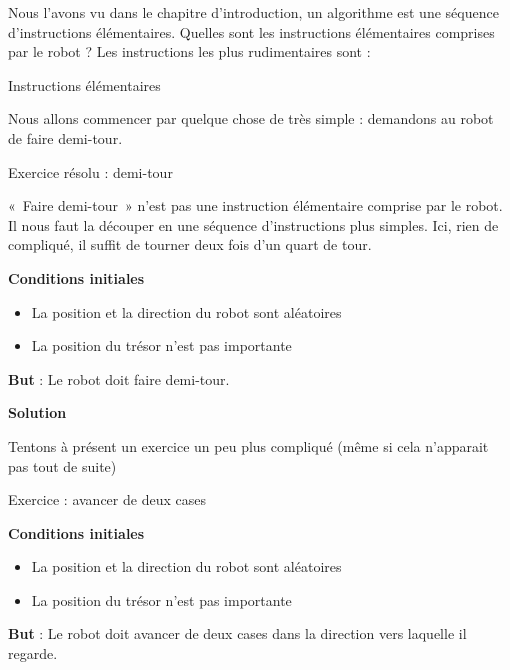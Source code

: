 	Nous l'avons vu dans le chapitre
	d'introduction, un algorithme est une séquence
	d'instructions élémentaires. Quelles sont les
	instructions élémentaires comprises par le robot ? Les instructions les
	plus rudimentaires sont :
	
	\begin{Emphase}{Instructions élémentaires}
	\end{Emphase}
		
	Nous allons commencer par quelque chose de très simple : demandons au
	robot de faire demi-tour.

	\begin{Emphase}{Exercice résolu : demi-tour}

		«~Faire demi-tour~» n'est pas une instruction
		élémentaire comprise par le robot. Il nous faut la découper en une
		séquence d'instructions plus simples. Ici, rien de
		compliqué, il suffit de tourner deux fois d'un quart
		de tour.

		\textbf{Conditions initiales}

		\begin{itemize}
		\item La position et la direction du robot sont aléatoires
		\item La position du trésor n'est pas importante
		\end{itemize}

		\textbf{But} : Le robot doit faire demi-tour.

		\textbf{Solution}

		
	\end{Emphase}

	Tentons à présent un exercice un peu plus compliqué
	(même si cela n'apparait pas tout de suite)

	\begin{Emphase}{Exercice : avancer de deux cases}

		\textbf{Conditions initiales}

		\begin{itemize}
		\item La position et la direction du robot sont aléatoires
		\item La position du trésor n'est pas importante
		\end{itemize}
		
		\textbf{But} : Le robot doit avancer de deux cases dans la direction
		vers laquelle il regarde.

	\end{Emphase}

